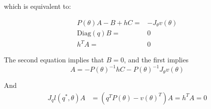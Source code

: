 which is equivalent to:

\begin{align}
   P(\theta)A - B + hC =& -J_\theta v(\theta)\\
   \mathrm{Diag}(q)B =& 0\\
   h^TA =& 0
\end{align}

The second equation implies that $B=0$, and the first implies
\begin{equation}
    A = - P(\theta)^{-1}hC - P(\theta)^{-1}J_\theta v(\theta)
\end{equation}

And
\begin{align}
    J_ql(q^*,\theta)A &= (q^TP(\theta) - v(\theta)^T)A = h^TA = 0
\end{align}
\vskip 0.2in
